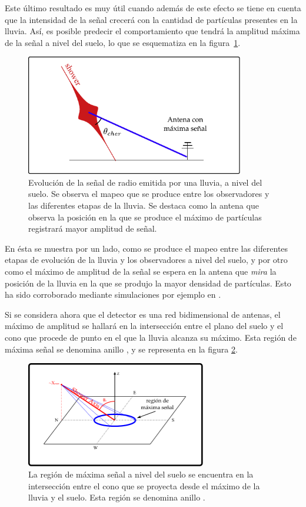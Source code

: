 	Este \'ultimo resultado es muy \'util cuando adem\'as de este efecto se tiene en cuenta que la intensidad de la se\~nal crecer\'a con la cantidad de part\'iculas presentes en la lluvia.
	As\'i, es posible predecir el comportamiento que tendr\'a la amplitud m\'axima de la se\~nal a nivel del suelo, lo que se esquematiza en la figura~\ref{fig:cher_emision_2}.
	\begin{figure}[ht!]
		\centering
		\includegraphics[width=0.85\textwidth]{fig/EASRadio/cono}
		\caption{\label{fig:cher_emision_2} Evoluci\'on de la se\~nal de radio emitida por una lluvia, a nivel del suelo. Se observa el mapeo que se produce entre los observadores y las diferentes etapas de la lluvia. Se destaca como la antena que observa la posici\'on en la que se produce el m\'aximo de part\'iculas registrar\'a mayor amplitud de se\~nal.}
	\end{figure}
	En \'esta se muestra por un lado, como se produce el mapeo entre las diferentes etapas de evoluci\'on de la lluvia y los observadores a nivel del suelo, y por otro como el m\'aximo de amplitud de la se\~nal se espera en la antena que \emph{mira} la posici\'on de la lluvia en la que se produjo la mayor densidad de part\'iculas.
	Esto ha sido corroborado mediante simulaciones por ejemplo en \cite{zhairezAir}.
	
	Si se considera ahora que el detector es una red bidimensional de antenas, el m\'aximo de amplitud se hallar\'a en la intersecci\'on entre el plano del suelo y el cono \cher{} que procede de punto en el que la lluvia alcanza su m\'aximo. Esta regi\'on de m\'axima se\~nal se denomina anillo \cher{}, y se representa en la figura \ref{fig:cono}.
	\begin{figure}[ht!]
		\centering
		\includegraphics[width=0.7\textwidth]{fig/EASRadio/chConeSch}
		\caption{\label{fig:cono} La región de máxima señal a nivel del suelo se encuentra en la intersección entre el cono \cher{} que se proyecta desde el máximo de la lluvia y el suelo. Esta regi\'on se denomina anillo \cher{}.}
	\end{figure}
	
